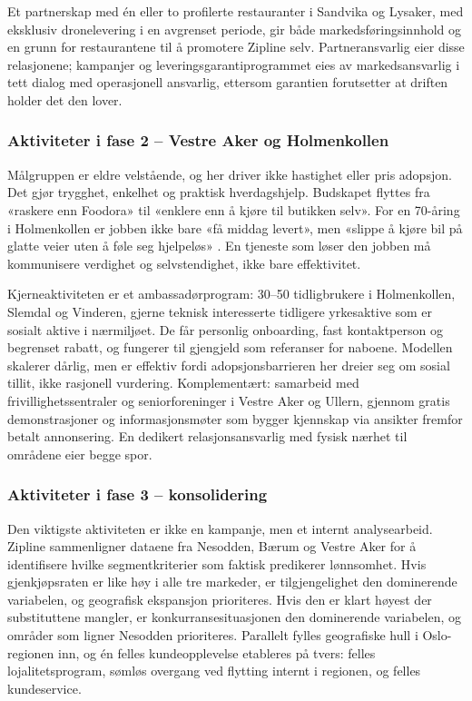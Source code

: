 Et partnerskap med én eller to profilerte restauranter i Sandvika og
Lysaker, med eksklusiv dronelevering i en avgrenset periode, gir både
markedsføringsinnhold og en grunn for restaurantene til å promotere
Zipline selv. Partneransvarlig eier disse relasjonene; kampanjer og
leveringsgarantiprogrammet eies av markedsansvarlig i tett dialog med
operasjonell ansvarlig, ettersom garantien forutsetter at driften holder
det den lover.

\subsubsection{Aktiviteter i fase 2 -- Vestre Aker og Holmenkollen}

Målgruppen er eldre velstående, og her driver ikke hastighet eller pris
adopsjon. Det gjør trygghet, enkelhet og praktisk hverdagshjelp.
Budskapet flyttes fra «raskere enn Foodora» til «enklere enn å kjøre til
butikken selv». For en 70-åring i Holmenkollen er jobben ikke bare «få
middag levert», men «slippe å kjøre bil på glatte veier uten å føle seg
hjelpeløs» \parencite{christensen2016}. En tjeneste som løser den jobben
må kommunisere verdighet og selvstendighet, ikke bare effektivitet.

Kjerneaktiviteten er et ambassadørprogram: 30--50 tidligbrukere i
Holmenkollen, Slemdal og Vinderen, gjerne teknisk interesserte tidligere
yrkesaktive som er sosialt aktive i nærmiljøet. De får personlig
onboarding, fast kontaktperson og begrenset rabatt, og fungerer til
gjengjeld som referanser for naboene. Modellen skalerer dårlig, men er
effektiv fordi adopsjonsbarrieren her dreier seg om sosial tillit, ikke
rasjonell vurdering. Komplementært: samarbeid med frivillighetssentraler
og seniorforeninger i Vestre Aker og Ullern, gjennom gratis
demonstrasjoner og informasjonsmøter som bygger kjennskap via ansikter
fremfor betalt annonsering. En dedikert relasjonsansvarlig med fysisk nærhet til
områdene eier begge spor.

\subsubsection{Aktiviteter i fase 3 -- konsolidering}

Den viktigste aktiviteten er ikke en kampanje, men et internt
analysearbeid. Zipline sammenligner dataene fra Nesodden, Bærum og Vestre
Aker for å identifisere hvilke segmentkriterier som faktisk predikerer
lønnsomhet. Hvis gjenkjøpsraten er like høy i alle tre markeder, er
tilgjengelighet den dominerende variabelen, og geografisk ekspansjon
prioriteres. Hvis den er klart høyest der substituttene mangler, er
konkurransesituasjonen den dominerende variabelen, og områder som ligner
Nesodden prioriteres. Parallelt fylles geografiske hull i Oslo-regionen
inn, og én felles kundeopplevelse etableres på tvers: felles
lojalitetsprogram, sømløs overgang ved flytting internt i regionen, og
felles kundeservice.


